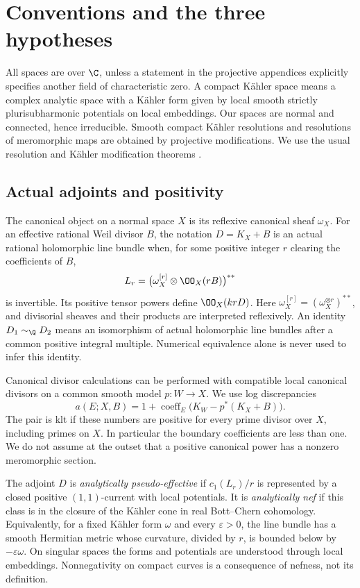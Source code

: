 \section{Conventions and the three hypotheses}\label{sec:premises}

All spaces are over \(\C\), unless a statement in the projective
appendices explicitly specifies another field of characteristic zero.
A compact K\"ahler space means a complex analytic space with a
K\"ahler form given by local smooth strictly plurisubharmonic potentials
on local embeddings. Our spaces are normal and connected, hence
irreducible. Smooth compact K\"ahler resolutions and resolutions of
meromorphic maps are obtained by projective modifications. We use the
usual resolution and K\"ahler modification theorems
\cite{HironakaResolution,VarouchasKahler}.

\subsection{Actual adjoints and positivity}

The canonical object on a normal space \(X\) is its reflexive canonical
sheaf \(\omega_X\). For an effective rational Weil divisor \(B\), the
notation \(D=K_X+B\) is an actual rational holomorphic line bundle
when, for some positive integer \(r\) clearing the coefficients of
\(B\),
\[
 L_r=\bigl(\omega_X^{[r]}\otimes\OO_X(rB)\bigr)^{**}
\]
is invertible. Its positive tensor powers define \(\OO_X(krD)\).
Here \(\omega_X^{[r]}=(\omega_X^{\otimes r})^{**}\), and divisorial
sheaves and their products are interpreted reflexively. An identity
\(D_1\sim_{\Q}D_2\) means an isomorphism of actual holomorphic line
bundles after a common positive integral multiple. Numerical equivalence
alone is never used to infer this identity.

Canonical divisor calculations can be performed with compatible local
canonical divisors on a common smooth model \(p:W\to X\). We use log
discrepancies
\begin{equation}\label{eq:discrepancy}
 a(E;X,B)=1+\operatorname{coeff}_E
       \bigl(K_W-p^*(K_X+B)\bigr).
\end{equation}
The pair is klt if these numbers are positive for every prime divisor
over \(X\), including primes on \(X\). In particular the boundary
coefficients are less than one. We do not assume at the outset that a
positive canonical power has a nonzero meromorphic section.

The adjoint \(D\) is \emph{analytically pseudo-effective} if
\(c_1(L_r)/r\) is represented by a closed positive \((1,1)\)-current
with local potentials. It is \emph{analytically nef} if this class is
in the closure of the K\"ahler cone in real Bott--Chern cohomology.
Equivalently, for a fixed K\"ahler form \(\omega\) and every
\(\varepsilon>0\), the line bundle has a smooth Hermitian metric
whose curvature, divided by \(r\), is bounded below by
\(-\varepsilon\omega\). On singular spaces the forms and potentials
are understood through local embeddings. Nonnegativity on compact
curves is a consequence of nefness, not its definition.

